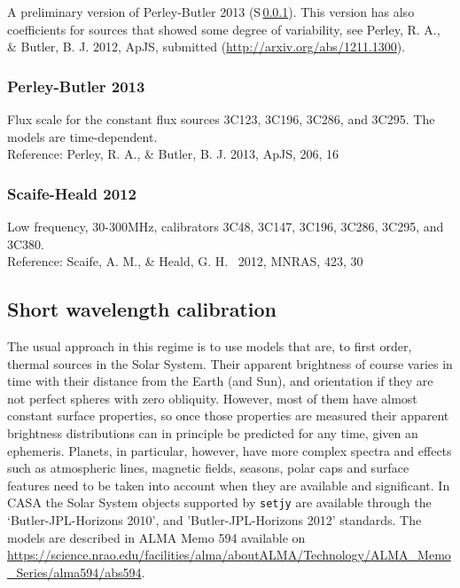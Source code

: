 A preliminary version of Perley-Butler 2013
(S\,\ref{section:conventions.longwavelength.perleybutler13}). This
version has also coefficients for sources that showed some degree of
variability, see Perley, R. A., \& Butler, B. J. 2012, ApJS, submitted
(\url{http://arxiv.org/abs/1211.1300}).

 
\subsubsection{Perley-Butler 2013}
\label{section:conventions.longwavelength.perleybutler13}

Flux scale for the constant flux sources 3C123, 3C196, 3C286,
and 3C295. The models are time-dependent.\\

Reference: Perley, R. A., \& Butler, B. J. 2013, ApJS, 206, 16

\subsubsection{Scaife-Heald 2012}
\label{section:conventions.longwavelength.scaifeheald}
Low frequency, 30-300MHz, calibrators 3C48, 3C147, 3C196, 3C286,
3C295, and 3C380. \\

Reference: Scaife, A. M., \& Heald, G. H. \ 2012, MNRAS, 423, 30

\subsection{Short wavelength calibration}
\label{section:conventions.shortwavelength}




The usual approach in this regime is to use models that are, to first
order, thermal sources in the Solar System. Their apparent brightness
of course varies in time with their distance from the Earth (and Sun),
and orientation if they are not perfect spheres with zero obliquity.
However, most of them have almost constant surface properties, so once
those properties are measured their apparent brightness distributions
can in principle be predicted for any time, given an
ephemeris. Planets, in particular, however, have more complex spectra
and effects such as atmospheric lines, magnetic fields, seasons, polar
caps and surface features need to be taken into account when they are
available and significant. In CASA the Solar System objects supported
by {\tt setjy} are available through the `Butler-JPL-Horizons 2010',
and 'Butler-JPL-Horizons 2012' standards. The models are described in ALMA
Memo 594 available on
\url{https://science.nrao.edu/facilities/alma/aboutALMA/Technology/ALMA_Memo_Series/alma594/abs594}.

